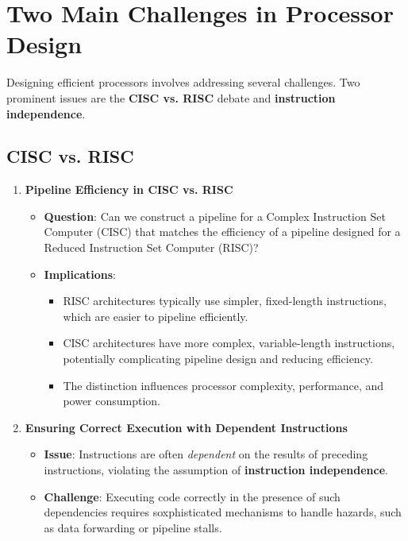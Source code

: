 \section{Two Main Challenges in Processor Design}

Designing efficient processors involves addressing several challenges. Two prominent issues are the \textbf{CISC vs. RISC} debate and \textbf{instruction independence}.

\subsection{CISC vs. RISC}
\begin{enumerate}
    \item \textbf{Pipeline Efficiency in CISC vs. RISC}
    \begin{itemize}
        \item[] \textbf{Question}: Can we construct a pipeline for a Complex Instruction Set Computer (CISC) that matches the efficiency of a pipeline designed for a Reduced Instruction Set Computer (RISC)?
        \item[] \textbf{Implications}:
        \begin{itemize}
            \item RISC architectures typically use simpler, fixed-length instructions, which are easier to pipeline efficiently.
            \item CISC architectures have more complex, variable-length instructions, potentially complicating pipeline design and reducing efficiency.
            \item The distinction influences processor complexity, performance, and power consumption.
        \end{itemize}
    \end{itemize}
    \item \textbf{Ensuring Correct Execution with Dependent Instructions}
    \begin{itemize}
        \item \textbf{Issue}: Instructions are often \textit{dependent} on the results of preceding instructions, violating the assumption of \textbf{instruction independence}.
        \item \textbf{Challenge}: Executing code correctly in the presence of such dependencies requires soxphisticated mechanisms to handle hazards, such as data forwarding or pipeline stalls.
    \end{itemize}
\end{enumerate}

